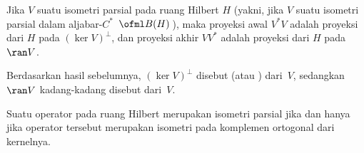 \begin{prop}\label{pi0117} Jika $V$ suatu isometri parsial pada ruang Hilbert $H$ (yakni, jika $V$ suatu isometri parsial
dalam aljabar-$C^*$~$\ofml B(H)$\,), maka proyeksi awal $V^*V$ adalah
proyeksi dari $H$ pada $(\ker V)^\perp$, dan proyeksi akhir $VV^*$ adalah proyeksi
dari $H$ pada~$\ran V$.
\end{prop}

Berdasarkan hasil sebelumnya, $(\ker V)^\perp$ disebut
  (atau ) dari~$V$, sedangkan $\ran V$ kadang-kadang disebut
 dari~$V$.

\begin{prop}\label{pi0121} Suatu operator pada ruang Hilbert merupakan isometri parsial jika dan hanya jika operator tersebut merupakan
isometri pada komplemen ortogonal dari kernelnya.
\end{prop}
